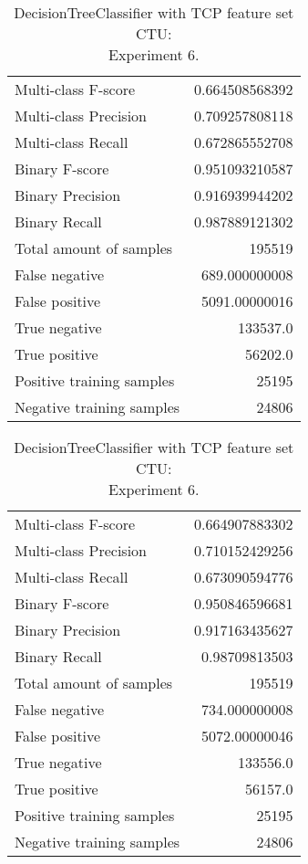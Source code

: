 \begin{table}[H]
\begin{minipage}{0.5\textwidth}
\caption{DecisionTreeClassifier with TCP feature set CTU: \\Experiment 5.}
\centering
\begin{tabular}{l r}
\toprule
Multi-class F-score & 0.664508568392 \\
Multi-class Precision & 0.709257808118 \\
Multi-class Recall & 0.672865552708 \\
\midrule
Binary F-score & 0.951093210587 \\
Binary Precision & 0.916939944202 \\
Binary Recall & 0.987889121302 \\
\midrule
Total amount of samples & 195519 \\
False negative & 689.000000008 \\
False positive & 5091.00000016 \\
True negative & 133537.0 \\
True positive & 56202.0 \\
\midrule
Positive training samples & 25195 \\
Negative training samples & 24806 \\
\bottomrule
\end{tabular}
\end{minipage}
\hfillx
\begin{minipage}{0.5\textwidth}
\caption{DecisionTreeClassifier with TCP feature set CTU: \\Experiment 6.}
\centering
\begin{tabular}{l r}
\toprule
Multi-class F-score & 0.664907883302 \\
Multi-class Precision & 0.710152429256 \\
Multi-class Recall & 0.673090594776 \\
\midrule
Binary F-score & 0.950846596681 \\
Binary Precision & 0.917163435627 \\
Binary Recall & 0.98709813503 \\
\midrule
Total amount of samples & 195519 \\
False negative & 734.000000008 \\
False positive & 5072.00000046 \\
True negative & 133556.0 \\
True positive & 56157.0 \\
\midrule
Positive training samples & 25195 \\
Negative training samples & 24806 \\
\bottomrule
\end{tabular}
\end{minipage}
\end{table}
